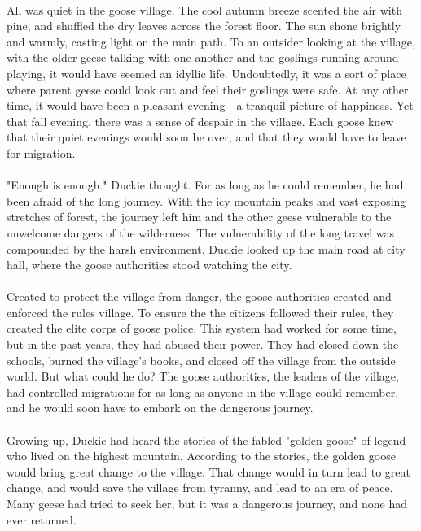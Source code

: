 \documentclass[a4paper,10pt,standalone]{book}
\begin{document}
\tableofcontents
\vfill
\pagebreak
\paragraph{} All was quiet in the goose village. The cool autumn breeze scented the air with pine, and shuffled the dry leaves across the forest floor. The sun shone brightly and warmly, casting light on the main path. To an outsider looking at the village, with the older geese talking with one another and the goslings running around playing, it would have seemed an idyllic life. Undoubtedly, it was a sort of place where parent geese could look out and feel their goslings were safe. At any other time, it would have been a pleasant evening - a tranquil picture of happiness. Yet that fall evening, there was a sense of despair in the village. Each goose knew that their quiet evenings would soon be over, and that they would have to leave for migration. 
\paragraph{} "Enough is enough." Duckie thought. For as long as he could remember, he had been afraid of the long journey. With the icy mountain peaks and vast exposing stretches of forest, the journey left him and the other geese vulnerable to the unwelcome dangers of the wilderness. The vulnerability of the long travel was compounded by the harsh environment. Duckie looked up the main road at city hall, where the goose authorities stood watching the city. 
\paragraph{} Created to protect the village from danger, the goose authorities created and enforced the rules village. To ensure the the citizens followed their rules, they created the elite corps of goose police. This system had worked for some time, but in the past years, they had abused their power. They had closed down the schools, burned the village's books, and closed off the village from the outside world. But what could he do? The goose authorities, the leaders of the village, had controlled migrations for as long as anyone in the village could remember, and he would soon have to embark on the dangerous journey.
\paragraph{} Growing up, Duckie had heard the stories of the fabled "golden goose" of legend who lived on the highest mountain. According to the stories, the golden goose would bring great change to the village. That change would in turn lead to great change, and would save the village from tyranny, and lead to an era of peace. Many geese had tried to seek her, but it was a dangerous journey, and none had ever returned. 
\end{document}
